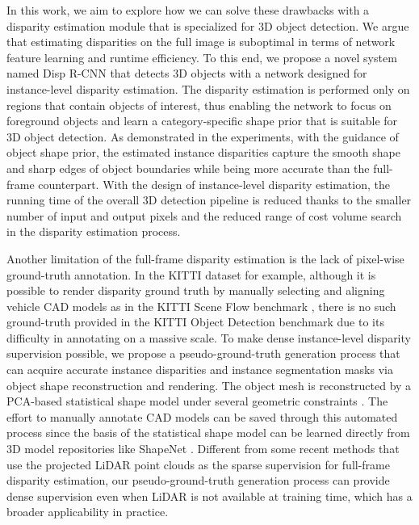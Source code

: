 \documentclass[10pt,twocolumn,letterpaper]{article}
\begin{document}
In this work, we aim to explore how we can solve these drawbacks with a disparity estimation module that is specialized for 3D object detection.
We argue that estimating disparities on the full image is suboptimal in terms of network feature learning and runtime efficiency.
To this end, we propose a novel system named Disp R-CNN that detects 3D objects with a network designed for instance-level disparity estimation.
The disparity estimation is performed only on regions that contain objects of interest,
thus enabling the network to focus on foreground objects and learn a category-specific shape prior that is suitable for 3D object detection.
As demonstrated in the experiments, with the guidance of object shape prior, the estimated instance disparities capture the smooth shape and sharp edges of object boundaries while being more accurate than the full-frame counterpart.
With the design of instance-level disparity estimation, the running time of the overall 3D detection pipeline is reduced thanks to the smaller number of input and output pixels and the reduced range of cost volume search in the disparity estimation process.

Another limitation of the full-frame disparity estimation is the lack of pixel-wise ground-truth annotation.
In the KITTI dataset \cite{geigerAreWeReady2012} for example,
although it is possible to render disparity ground truth by manually selecting and aligning vehicle CAD models as in the KITTI Scene Flow benchmark \cite{menzeObjectSceneFlow2015}, 
there is no such ground-truth provided in the KITTI Object Detection benchmark due to its difficulty in annotating on a massive scale.
To make dense instance-level disparity supervision possible,
we propose a pseudo-ground-truth generation process that can acquire accurate instance disparities and instance segmentation masks via object shape reconstruction and rendering.
The object mesh is reconstructed by a PCA-based statistical shape model under several geometric constraints \cite{leventon2002statistical, engelmann2016joint}.
The effort to manually annotate CAD models can be saved through this automated process since the basis of the statistical shape model can be learned directly from 3D model repositories like ShapeNet \cite{chang2015shapenet}.
Different from some recent methods \cite{wang2019pseudo,you2019pseudo,chen2020dsgn} that use the projected LiDAR point clouds as the sparse supervision for full-frame disparity estimation, our pseudo-ground-truth generation process can provide dense supervision even when LiDAR is not available at training time, which has a broader applicability in practice.
\end{document}
